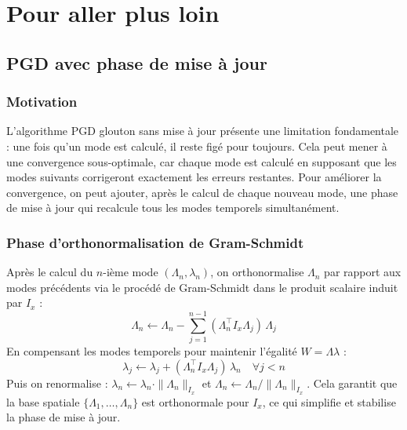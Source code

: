 \documentclass[11pt,a4paper]{article}
\begin{document}
\section{Pour aller plus loin}

\subsection{PGD avec phase de mise à jour}

\subsubsection{Motivation}

L'algorithme PGD glouton sans mise à jour présente une limitation fondamentale :
une fois qu'un mode est calculé, il reste figé pour toujours.
Cela peut mener à une convergence sous-optimale, car chaque mode est calculé
en supposant que les modes suivants corrigeront exactement les erreurs restantes.
Pour améliorer la convergence, on peut ajouter, après le calcul de chaque nouveau mode,
une phase de mise à jour qui recalcule tous les modes temporels simultanément.

\subsubsection{Phase d'orthonormalisation de Gram-Schmidt}

Après le calcul du $n$-ième mode $(\Lambda_n, \lambda_n)$, on orthonormalise
$\Lambda_n$ par rapport aux modes précédents via le procédé de Gram-Schmidt
dans le produit scalaire induit par $I_x$ :
\begin{equation}
    \Lambda_n \leftarrow \Lambda_n
    - \sum_{j=1}^{n-1} (\Lambda_n^\top I_x \Lambda_j)\, \Lambda_j
\end{equation}
En compensant les modes temporels pour maintenir l'égalité $W = \Lambda\lambda$ :
\begin{equation}
    \lambda_j \leftarrow \lambda_j
    + (\Lambda_n^\top I_x \Lambda_j)\, \lambda_n \quad \forall j < n
\end{equation}
Puis on renormalise : $\lambda_n \leftarrow \lambda_n \cdot \|\Lambda_n\|_{I_x}$ et
$\Lambda_n \leftarrow \Lambda_n / \|\Lambda_n\|_{I_x}$.
Cela garantit que la base spatiale $\{\Lambda_1, \ldots, \Lambda_n\}$ est
orthonormale pour $I_x$, ce qui simplifie et stabilise la phase de mise à jour.
\end{document}
